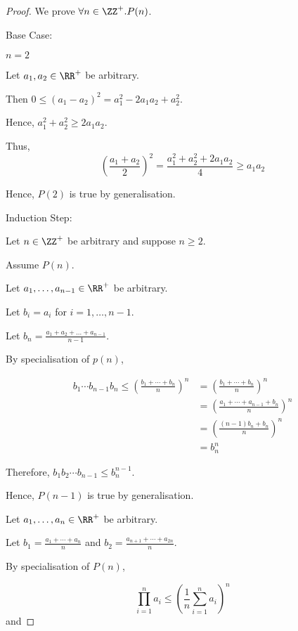 \documentclass[11pt]{scrartcl}
\begin{document}
\begin{proof}
  We prove $\forall n \in \ZZ^+.P(n)$.

  Base Case:

  $n = 2$

  Let $a_1, a_2 \in \RR^+$ be arbitrary.

  Then $0\leq (a_1-a_2)^2 = a_1^2-2a_1a_2+a_2^2$.

  Hence, $a_1^2+a_2^2\geq 2a_1a_{2}$.

  Thus, 
  \begin{equation*}
    (\frac{a_1+a_2}{2})^2= \frac{a_1^2+a_2^2+2a_1a_2}{4} \geq a_1a_2
  \end{equation*}

  Hence, $P(2)$ is true by generalisation.

  Induction Step:

  Let $n\in\ZZ^{+}$ be arbitrary and suppose $n\geq 2$.

  Assume $P(n)$.

  Let $a_1, \dots, a_{n-1}\in\RR^{+}$ be arbitrary.

  Let $b_i=a_i$ for $i=1, \dots, n-1$.

  Let $b_n = \frac{a_1+a_2+\dots+a_{n-1}}{n-1}$.

  By specialisation of $p(n)$,

  \begin{align}
    b_1\cdots b_{n-1}b_n\leq (\frac{b_1+\cdots+b_n}{n})^n & = (\frac{b_1+\cdots+b_n}{n})^n \\
                                                          & =  (\frac{a_1+\cdots+a_{n-1}+b_n}{n})^n \\
                                                          &  =  (\frac{(n-1)b_n+b_n}{n})^n \\
                                                          &  =  b_n^n 
  \end{align}

  Therefore, $b_1b_2\cdots b_{n-1} \leq b_n^{n-1}$.

  Hence, $P(n-1)$ is true by generalisation.

  Let $a_1, \dots, a_n\in\RR^+$ be arbitrary.

  Let $b_1=\frac{a_1+\cdots+a_n}{n}$ and $b_2=\frac{a_{n+1}+\cdots+a_{2n}}{n}$.

  By specialisation of $P(n)$,
  
  \begin{equation*}
    \prod_{i=1}^na_i\leq (\frac{1}{n}\sum_{i=1}^na_i)^n
  \end{equation*}
  and
  

\end{proof}
\end{document}
